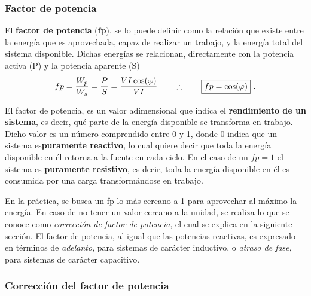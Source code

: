          \subsubsection{Factor de potencia}
         
         El \textbf{factor de potencia} (\textbf{fp}), se lo puede definir como la relación que
               existe entre la energía que es aprovechada, capaz de realizar un trabajo, y la 
               energía total del sistema disponible.
               Dichas energías se relacionan, directamente con la potencia activa (P) y 
               la potencia aparente (S) 
               \begin{equation}
               fp = \frac{W_p}{W_s} = \frac{P}{S} = \dfrac{V I \cos(\varphi)}{V I} \notag \\
                        \hspace{20pt} \therefore \hspace{20pt} \boxed{fp = \cos(\varphi)}~.\label{eqn:fpFinal} 
               \end{equation}

               El factor de potencia, es un valor adimensional que indica el 
               \textbf{rendimiento de un sistema}, es decir, qué parte de la energía disponible 
               se transforma en trabajo. Dicho valor es un número comprendido entre 0 y 1, donde 
               0 indica que un sistema es\textbf{puramente reactivo}, lo cual quiere decir que 
               toda la energía disponible en él retorna a la fuente en cada ciclo. En el caso de
                un $fp = 1$ el sistema es \textbf{puramente resistivo}, es decir, toda la energía
               disponible en él es consumida por una carga transformándose en trabajo.

               En la práctica, se busca un fp lo más cercano a 1 para aprovechar al máximo la 
               energía. En caso de no tener un valor cercano a la unidad, se realiza lo que se 
               conoce como \textit{corrección de factor de potencia}, el cual se explica en la 
               siguiente sección.
               El factor de potencia, al igual que las potencias reactivas, es expresado en 
               términos de \textit{adelanto}, para sistemas de carácter inductivo, o 
               \textit{atraso de fase}, para sistemas de carácter capacitivo.

            \subsubsection{Corrección del factor de potencia}
               
